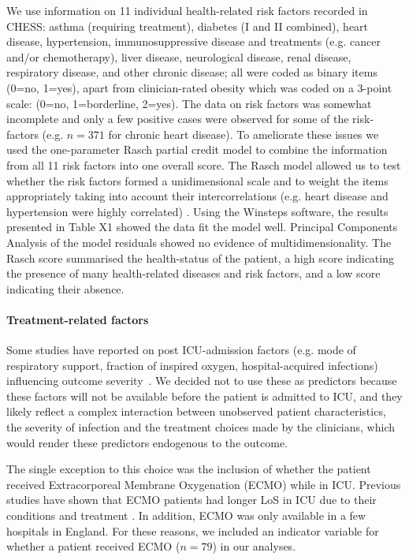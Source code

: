 \documentclass[review]{elsarticle}
\begin{document}
 We use information on 11 individual health-related risk factors recorded in CHESS: asthma (requiring treatment), diabetes (I and II combined), heart disease, hypertension, immunosuppressive disease and treatments (e.g. cancer and/or chemotherapy), liver disease, neurological disease, renal disease, respiratory disease, and other chronic disease; all were coded as binary items (0=no, 1=yes), apart from clinician-rated obesity which was coded on a 3-point scale: (0=no, 1=borderline, 2=yes). The data on risk factors was somewhat incomplete and only a few positive cases were observed for some of the risk-factors (e.g. $n = 371$ for chronic heart disease). To ameliorate these issues we used the one-parameter Rasch partial credit model to combine the information from all 11 risk factors into one overall score. The Rasch model allowed us to test whether the risk factors formed a unidimensional scale and to weight the items appropriately taking into account their intercorrelations (e.g. heart disease and hypertension were highly correlated) \cite{wolfe2007instrument}. Using the Winsteps software, the results presented in Table X1 showed the data fit the model well. Principal Components Analysis of the model residuals showed no evidence of multidimensionality. The Rasch score summarised the health-status of the patient, a high score indicating the presence of many health-related diseases and risk factors, and a low score indicating their absence. 

\paragraph{Treatment-related factors} Some studies have reported on post ICU-admission factors (e.g. mode of respiratory support, fraction of inspired oxygen, hospital-acquired infections) influencing outcome severity~\cite{grasselli2020critical}. We decided not to use these as predictors because these factors will not be available before the patient is admitted to ICU, and they likely reflect a complex interaction between unobserved patient characteristics, the severity of infection and the treatment choices made by the clinicians, which would render these predictors endogenous to the outcome. 

The single exception to this choice was the inclusion of whether the patient received Extracorporeal Membrane Oxygenation (ECMO) while in ICU. Previous studies have shown that ECMO patients had longer LoS in ICU due to their conditions and treatment \citep{brechot2013venoarterial, peek2009efficacy}. In addition, ECMO was only available in a few hospitals in England. For these reasons, we included an indicator variable for whether a patient received ECMO ($n = 79$) in our analyses.  
\end{document}
